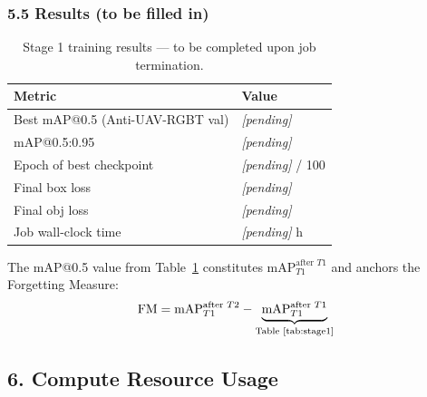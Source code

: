 \subsubsection*{5.5 Results (to be filled in)}

\begin{table}[h]
\centering
\caption{Stage 1 training results — to be completed upon job
         termination.}
\label{tab:stage1}
\begin{tabular}{ll}
\hline
\textbf{Metric}                 & \textbf{Value} \\
\hline
Best mAP@0.5 (Anti-UAV-RGBT val) & \textit{[pending]} \\
mAP@0.5:0.95                    & \textit{[pending]} \\
Epoch of best checkpoint        & \textit{[pending]} / 100 \\
Final box loss                  & \textit{[pending]} \\
Final obj loss                  & \textit{[pending]} \\
Job wall-clock time             & \textit{[pending]} h \\
\hline
\end{tabular}
\end{table}

\noindent The mAP@0.5 value from Table~\ref{tab:stage1} constitutes
$\text{mAP}_{T1}^{\text{after }T1}$ and anchors the Forgetting
Measure:
\[
    \text{FM} = \text{mAP}_{T1}^{\text{after }T2}
              - \underbrace{\text{mAP}_{T1}^{\text{after }T1}}_{\text{Table~\ref{tab:stage1}}}
\]

\subsection*{6. Compute Resource Usage}

